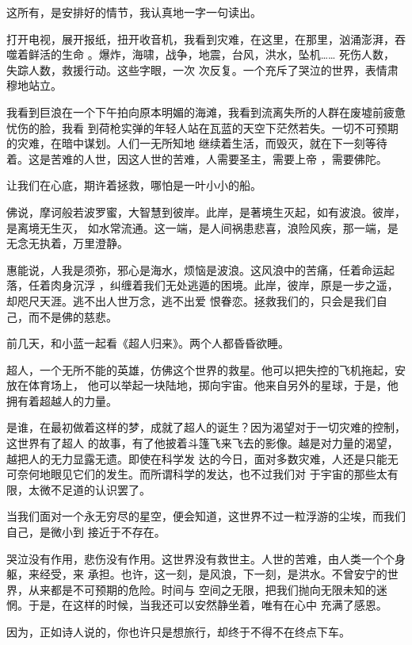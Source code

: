 \documentclass[12pt,a4paper]{article}
\begin{document}
		这所有，是安排好的情节，我认真地一字一句读出。

	\endwriting



		打开电视，展开报纸，扭开收音机，我看到灾难，在这里，在那里，汹涌澎湃，吞噬着鲜活的生命
	。爆炸，海啸，战争，地震，台风，洪水，坠机…… 死伤人数，失踪人数，救援行动。这些字眼，一次
	次反复。一个充斥了哭泣的世界，表情肃穆地站立。


		我看到巨浪在一个下午拍向原本明媚的海滩，我看到流离失所的人群在废墟前疲惫忧伤的脸，我看
	到荷枪实弹的年轻人站在瓦蓝的天空下茫然若失。一切不可预期的灾难，在暗中谋划。人们一无所知地
	继续着生活，而毁灭，就在下一刻等待着。这是苦难的人世，因这人世的苦难，人需要圣主，需要上帝
	，需要佛陀。


		让我们在心底，期许着拯救，哪怕是一叶小小的船。

		佛说，摩诃般若波罗蜜，大智慧到彼岸。此岸，是著境生灭起，如有波浪。彼岸，是离境无生灭，
	如水常流通。这一端，是人间祸患悲喜，浪险风疾，那一端，是无念无执着，万里澄静。

		惠能说，人我是须弥，邪心是海水，烦恼是波浪。这风浪中的苦痛，任着命运起落，任着肉身沉浮
	，纠缠着我们无处逃遁的困境。此岸，彼岸，原是一步之遥，却咫尺天涯。逃不出人世万念，逃不出爱
	恨眷恋。拯救我们的，只会是我们自己，而不是佛的慈悲。


		前几天，和小蓝一起看《超人归来》。两个人都昏昏欲睡。

		超人，一个无所不能的英雄，仿佛这个世界的救星。他可以把失控的飞机拖起，安放在体育场上，
	他可以举起一块陆地，掷向宇宙。他来自另外的星球，于是，他拥有着超越人的力量。

		是谁，在最初做着这样的梦，成就了超人的诞生？因为渴望对于一切灾难的控制，这世界有了超人
	的故事，有了他披着斗篷飞来飞去的影像。越是对力量的渴望，越把人的无力显露无遗。即使在科学发
	达的今日，面对多数灾难，人还是只能无可奈何地眼见它们的发生。而所谓科学的发达，也不过我们对
	于宇宙的那些太有限，太微不足道的认识罢了。

		当我们面对一个永无穷尽的星空，便会知道，这世界不过一粒浮游的尘埃，而我们自己，是微小到
	接近于不存在。


		哭泣没有作用，悲伤没有作用。这世界没有救世主。人世的苦难，由人类一个个身躯，来经受，来
	承担。也许，这一刻，是风浪，下一刻，是洪水。不曾安宁的世界，从来都是不可预期的危险。时间与
	空间之无限，把我们抛向无限未知的迷惘。于是，在这样的时候，当我还可以安然静坐着，唯有在心中
	充满了感恩。

		因为，正如诗人说的，你也许只是想旅行，却终于不得不在终点下车。
\end{document}
